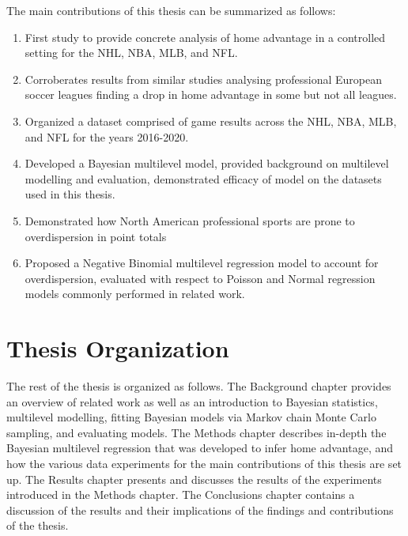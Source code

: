 The main contributions of this thesis can be summarized as follows:
\begin{enumerate}
	\item First study to provide concrete analysis of home advantage in a controlled setting for the NHL, NBA, MLB, and NFL.
	\item Corroberates results from similar studies analysing professional European soccer leagues finding a drop in home advantage in some but not all leagues.
	\item Organized a dataset comprised of game results across the NHL, NBA, MLB, and NFL for the years 2016-2020.
	\item Developed a Bayesian multilevel model, provided background on multilevel modelling and evaluation, demonstrated efficacy of model on the datasets used in this thesis.
	\item Demonstrated how North American professional sports are prone to overdispersion in point totals
	\item Proposed a Negative Binomial multilevel regression model to account for overdispersion, evaluated with respect to Poisson and Normal regression models commonly performed in related work.
\end{enumerate}

\section{Thesis Organization}

The rest of the thesis is organized as follows. The Background chapter provides an overview of related work as well as an introduction to Bayesian statistics, multilevel modelling, fitting Bayesian models via Markov chain Monte Carlo sampling, and evaluating models. The Methods chapter describes in-depth the Bayesian multilevel regression that was developed to infer home advantage, and how the various data experiments for the main contributions of this thesis are set up. The Results chapter presents and discusses the results of the experiments introduced in the Methods chapter. The Conclusions chapter contains a discussion of the results and their implications of the findings and contributions of the thesis.
